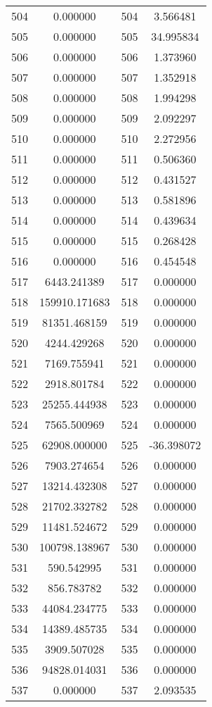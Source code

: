 \documentclass[12pt]{article}
\begin{document}
\begin{longtable}{@{}cccc@{}}
504 & 0.000000 & 504 & 3.566481 \\
505 & 0.000000 & 505 & 34.995834 \\
506 & 0.000000 & 506 & 1.373960 \\
507 & 0.000000 & 507 & 1.352918 \\
508 & 0.000000 & 508 & 1.994298 \\
509 & 0.000000 & 509 & 2.092297 \\
510 & 0.000000 & 510 & 2.272956 \\
511 & 0.000000 & 511 & 0.506360 \\
512 & 0.000000 & 512 & 0.431527 \\
513 & 0.000000 & 513 & 0.581896 \\
514 & 0.000000 & 514 & 0.439634 \\
515 & 0.000000 & 515 & 0.268428 \\
516 & 0.000000 & 516 & 0.454548 \\
517 & 6443.241389 & 517 & 0.000000 \\
518 & 159910.171683 & 518 & 0.000000 \\
519 & 81351.468159 & 519 & 0.000000 \\
520 & 4244.429268 & 520 & 0.000000 \\
521 & 7169.755941 & 521 & 0.000000 \\
522 & 2918.801784 & 522 & 0.000000 \\
523 & 25255.444938 & 523 & 0.000000 \\
524 & 7565.500969 & 524 & 0.000000 \\
525 & 62908.000000 & 525 & -36.398072 \\
526 & 7903.274654 & 526 & 0.000000 \\
527 & 13214.432308 & 527 & 0.000000 \\
528 & 21702.332782 & 528 & 0.000000 \\
529 & 11481.524672 & 529 & 0.000000 \\
530 & 100798.138967 & 530 & 0.000000 \\
531 & 590.542995 & 531 & 0.000000 \\
532 & 856.783782 & 532 & 0.000000 \\
533 & 44084.234775 & 533 & 0.000000 \\
534 & 14389.485735 & 534 & 0.000000 \\
535 & 3909.507028 & 535 & 0.000000 \\
536 & 94828.014031 & 536 & 0.000000 \\
537 & 0.000000 & 537 & 2.093535 \\

\end{longtable}
\end{document}
